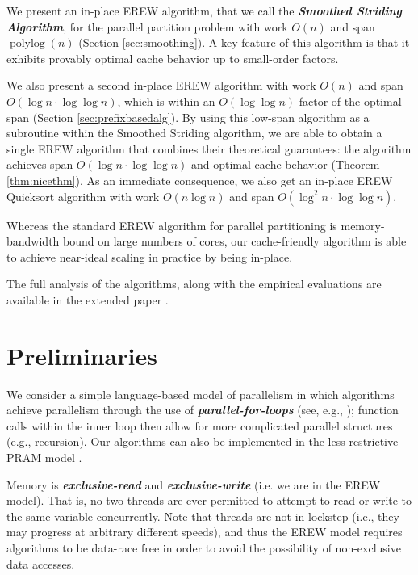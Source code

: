 \documentclass[sigconf]{acmart}
\newcommand{\polylog}{\operatorname{polylog}}
\newcommand{\defn}[1]{{\textit{\textbf{\boldmath #1}}}}
\renewcommand{\paragraph}[1]{\vspace{0.09in}\noindent{\bf \boldmath #1.}}
\theoremstyle{remark}
\theoremstyle{remark}
\begin{document}
\paragraph{Results}
We present an in-place EREW algorithm, that we call the \defn{Smoothed Striding
Algorithm}, for the parallel partition problem with work $O(n)$ and span
$\polylog(n)$ (Section \ref{sec:smoothing}). A key feature of this algorithm is
that it exhibits provably optimal cache behavior up to small-order factors.

We also present a second in-place EREW algorithm with work $O(n)$ and span
$O(\log n \cdot \log \log n)$, which is within an $O(\log\log n)$ factor of the
optimal span (Section \ref{sec:prefixbasedalg}). By using this low-span
algorithm as a subroutine within the Smoothed Striding algorithm, we are able to
obtain a single EREW algorithm that combines their theoretical guarantees: the
algorithm achieves span $O(\log n \cdot \log \log n)$ and optimal cache
behavior (Theorem \ref{thm:nicethm}). As an immediate consequence, we also get an in-place EREW Quicksort
algorithm with work $O(n \log n)$ and span $O(\log^2 n \cdot \log \log n)$.

Whereas the standard EREW algorithm for parallel partitioning is
memory-bandwidth bound on large numbers of cores, our cache-friendly
algorithm is able to achieve near-ideal scaling in practice by being in-place.

The full analysis of the algorithms, along with the empirical evaluations are available in the extended paper \cite{ARXIV}.


\section{Preliminaries}\label{secprelim}

\paragraph{Workflow Model} We consider a simple language-based model of parallelism in which algorithms achieve parallelism through the use of \defn{parallel-for-loops} (see, e.g.,
\cite{Blelloch96,AcarBl16}); function calls within the inner loop
then allow for more complicated parallel structures (e.g., recursion). Our algorithms can also be implemented in the less restrictive PRAM model \cite{Blelloch96, AcarBl16}.

\paragraph{Memory Model}
Memory is \defn{exclusive-read} and \defn{exclusive-write} (i.e. we are in the
EREW model). That is, no two threads are ever permitted to attempt to read or
write to the same variable concurrently. Note that threads are not in lockstep
(i.e., they may progress at arbitrary different speeds), and thus the EREW
model requires algorithms to be data-race free in order to avoid the
possibility of non-exclusive data accesses.
\end{document}
